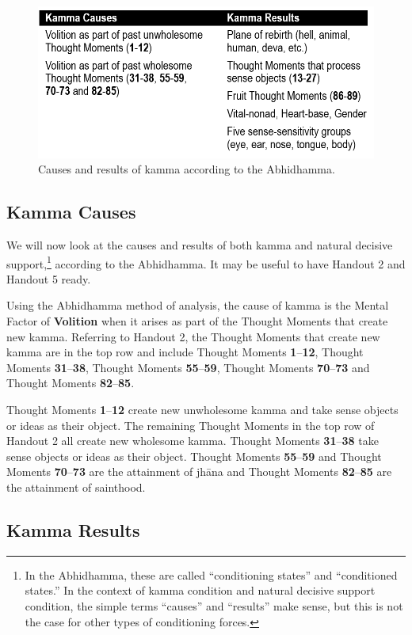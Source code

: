 \begin{figure}[h]
\centering
\includegraphics[width=0.7\linewidth]{./Diagrams/Kamma}
\caption{Causes and results of kamma according to the Abhidhamma.}
\label{fig:Kamma}
\end{figure}

\subsection*{Kamma Causes}

We will now look at the causes and results of both kamma and natural decisive support,\footnote{In the Abhidhamma, these are called “conditioning states” and “conditioned states.” In the context of kamma condition and natural decisive support condition, the simple terms “causes” and “results” make sense, but this is not the case for other types of conditioning forces.} according to the Abhidhamma. It may be useful to have Handout 2 and Handout 5 ready.

Using the Abhidhamma method of analysis, the cause of kamma is the Mental Factor of \textbf{Volition} when it arises as part of the Thought Moments that create new kamma. Referring to Handout 2, the Thought Moments that create new kamma are in the top row and include Thought Moments \textbf{1}--\textbf{12}, Thought Moments \textbf{31}--\textbf{38}, Thought Moments \textbf{55}--\textbf{59}, Thought Moments \textbf{70}--\textbf{73} and Thought Moments \textbf{82}--\textbf{85}.

Thought Moments \textbf{1}--\textbf{12} create new unwholesome kamma and take sense objects or ideas as their object. The remaining Thought Moments in the top row of Handout 2 all create new wholesome kamma. Thought Moments \textbf{31}--\textbf{38} take sense objects or ideas as their object. Thought Moments \textbf{55}--\textbf{59} and Thought Moments \textbf{70}--\textbf{73} are the attainment of jhāna and Thought Moments \textbf{82}--\textbf{85} are the attainment of sainthood.

\subsection*{Kamma Results}

